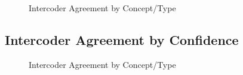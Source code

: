 \documentclass{article}
\begin{document}
\begin{figure}[H]
\caption{Intercoder Agreement by Concept/Type \label{fig:intercoderagreement}}
\end{figure}
\clearpage

\hypertarget{app:agreement_by_confidence}{%
\subsection{Intercoder Agreement by
Confidence}\label{app:agreement_by_confidence}}

\hphantom{em}

\begin{figure}[H]
\caption{Intercoder Agreement by Concept/Type \label{fig:intercoderagreement_confidence}}
\end{figure}
\clearpage
\end{document}
